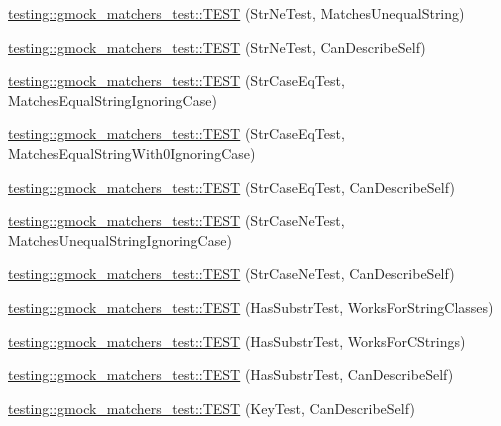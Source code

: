 \begin{DoxyCompactItemize}
\mbox{\hyperlink{namespacetesting_1_1gmock__matchers__test_a3c0a0ca54e3d34c55bd30c2b5572d902}{testing\+::gmock\+\_\+matchers\+\_\+test\+::\+T\+E\+ST}} (Str\+Ne\+Test, Matches\+Unequal\+String)
\item 
\mbox{\hyperlink{namespacetesting_1_1gmock__matchers__test_a4daef0c28c6b07cb3d6a6306c05599b0}{testing\+::gmock\+\_\+matchers\+\_\+test\+::\+T\+E\+ST}} (Str\+Ne\+Test, Can\+Describe\+Self)
\item 
\mbox{\hyperlink{namespacetesting_1_1gmock__matchers__test_ae0c0b82b3895923747dc70cb9339a8dc}{testing\+::gmock\+\_\+matchers\+\_\+test\+::\+T\+E\+ST}} (Str\+Case\+Eq\+Test, Matches\+Equal\+String\+Ignoring\+Case)
\item 
\mbox{\hyperlink{namespacetesting_1_1gmock__matchers__test_aa159c9a52c6dc18cb7f214fbb5bddece}{testing\+::gmock\+\_\+matchers\+\_\+test\+::\+T\+E\+ST}} (Str\+Case\+Eq\+Test, Matches\+Equal\+String\+With0\+Ignoring\+Case)
\item 
\mbox{\hyperlink{namespacetesting_1_1gmock__matchers__test_ab4fb6542ea3a7789850668a9266a80ef}{testing\+::gmock\+\_\+matchers\+\_\+test\+::\+T\+E\+ST}} (Str\+Case\+Eq\+Test, Can\+Describe\+Self)
\item 
\mbox{\hyperlink{namespacetesting_1_1gmock__matchers__test_a9a627f8538cfff62fbaee86ac465f6c8}{testing\+::gmock\+\_\+matchers\+\_\+test\+::\+T\+E\+ST}} (Str\+Case\+Ne\+Test, Matches\+Unequal\+String\+Ignoring\+Case)
\item 
\mbox{\hyperlink{namespacetesting_1_1gmock__matchers__test_ae953891c7961b6ffd51dc712be8d24de}{testing\+::gmock\+\_\+matchers\+\_\+test\+::\+T\+E\+ST}} (Str\+Case\+Ne\+Test, Can\+Describe\+Self)
\item 
\mbox{\hyperlink{namespacetesting_1_1gmock__matchers__test_a2a1043a0b8bfb4bc0b5fb539317132a3}{testing\+::gmock\+\_\+matchers\+\_\+test\+::\+T\+E\+ST}} (Has\+Substr\+Test, Works\+For\+String\+Classes)
\item 
\mbox{\hyperlink{namespacetesting_1_1gmock__matchers__test_a147dde340ba8f77308cd116d3bb831d6}{testing\+::gmock\+\_\+matchers\+\_\+test\+::\+T\+E\+ST}} (Has\+Substr\+Test, Works\+For\+C\+Strings)
\item 
\mbox{\hyperlink{namespacetesting_1_1gmock__matchers__test_ae47e8ad8f8a4a33ac08b596eb839380e}{testing\+::gmock\+\_\+matchers\+\_\+test\+::\+T\+E\+ST}} (Has\+Substr\+Test, Can\+Describe\+Self)
\item 
\mbox{\hyperlink{namespacetesting_1_1gmock__matchers__test_acdbdca45a537261fd168cdb8df9348d7}{testing\+::gmock\+\_\+matchers\+\_\+test\+::\+T\+E\+ST}} (Key\+Test, Can\+Describe\+Self)

\end{DoxyCompactItemize}
